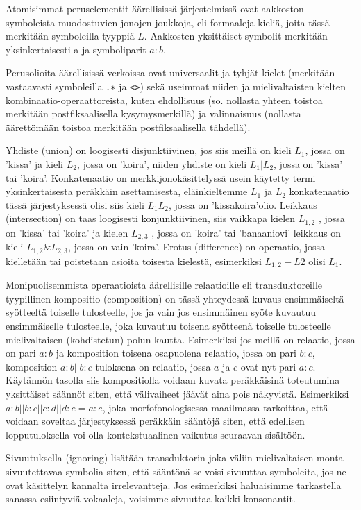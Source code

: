 \documentclass[free]{flammie}
\begin{document}
Atomisimmat peruselementit äärellisissä järjestelmissä ovat aakkoston symboleista muodostuvien jonojen joukkoja, eli formaaleja kieliä, joita tässä merkitään symboleilla tyyppiä $L$. Aakkosten yksittäiset symbolit merkitään yksinkertaisesti a
ja symboliparit $a : b$.

Perusolioita äärellisissä verkoissa ovat universaalit ja tyhjät kielet
(merkitään vastaavasti symboleilla \texttt{.∗} ja \texttt{<>}) sekä useimmat niiden ja mielivaltaisten kielten
kombinaatio-operaattoreista, kuten ehdollisuus (so. nollasta yhteen toistoa merkitään postfiksaalisella kysymysmerkillä) ja valinnaisuus (nollasta äärettömään toistoa merkitään postfiksaalisella tähdellä).

Yhdiste (union) on loogisesti disjunktiivinen, jos siis meillä on kieli $L_1$,
jossa on ’kissa’ ja kieli $L_2$, jossa on ’koira’, niiden yhdiste on kieli $L_1
| L_2$,
jossa on ’kissa’ tai ’koira’. Konkatenaatio on merkkijonokäsittelyssä usein
käytetty termi yksinkertaisesta peräkkäin asettamisesta, eläinkieltemme $L_1$ ja
$L_2$
konkatenaatio tässä järjestyksessä olisi siis kieli $L_1 L_2$, jossa on
’kissakoira’olio. Leikkaus (intersection) on taas loogisesti konjunktiivinen,
siis vaikkapa kielen $L_{1,2}$ , jossa on ’kissa’ tai ’koira’ ja kielen $L_{2,3}$ , jossa
on ’koira’ tai ’banaaniovi’ leikkaus on kieli $L_{1,2} \& L_{2,3}$, jossa on vain ’koira’. Erotus (difference)
on operaatio, jossa kielletään tai poistetaan asioita toisesta kielestä, esimerkiksi
$L_{1,2} − L2$ olisi $L_1$.

Monipuolisemmista operaatioista äärellisille relaatioille eli transduktoreille tyypillinen kompositio (composition) on tässä yhteydessä kuvaus ensimmäiseltä syötteeltä toiselle tulosteelle, jos ja vain jos ensimmäinen syöte kuvautuu ensimmäiselle tulosteelle, joka kuvautuu toisena syötteenä toiselle tulosteelle mielivaltaisen (kohdistetun) polun kautta. Esimerkiksi jos meillä on relaatio, jossa on pari
$a : b$ ja komposition toisena osapuolena relaatio, jossa on pari $b : c$,
komposition $a : b || b : c$ tuloksena on relaatio, jossa $a$ ja $c$ ovat nyt
pari $a : c$. Käytännön tasolla siis kompositiolla voidaan kuvata peräkkäisinä toteutumina yksittäiset säännöt siten, että välivaiheet jäävät aina pois näkyvistä. Esimerkiksi
$a : b || b : c || c : d || d : e = a : e$, joka morfofonologisessa maailmassa tarkoittaa, että voidaan soveltaa järjestyksessä peräkkäin sääntöjä siten, että edellisen lopputuloksella voi olla kontekstuaalinen vaikutus seuraavan sisältöön.

Sivuutuksella (ignoring) lisätään transduktorin joka väliin mielivaltaisen monta sivuutettavaa symbolia siten, että sääntönä se voisi sivuuttaa symboleita, jos ne ovat
käsittelyn kannalta irrelevantteja. Jos esimerkiksi haluaisimme tarkastella sanassa
esiintyviä vokaaleja, voisimme sivuuttaa kaikki konsonantit.
\end{document}
